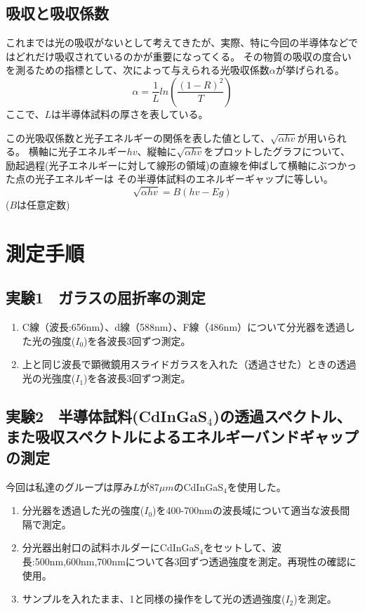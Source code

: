 \documentclass[11pt,a4j]{jsarticle}
\begin{document}
  \subsection{吸収と吸収係数}
   これまでは光の吸収がないとして考えてきたが、実際、特に今回の半導体などではどれだけ吸収されているのかが重要になってくる。
   その物質の吸収の度合いを測るための指標として、次によって与えられる光吸収係数$\alpha$が挙げられる。
   \begin{equation}
   \alpha = \frac{1}{L} ln(\frac{(1-R)^2}{T})
   \end{equation}
   ここで、$L$は半導体試料の厚さを表している。
   
   この光吸収係数と光子エネルギーの関係を表した値として、$\sqrt{\alpha h v}$が用いられる。
   横軸に光子エネルギー$hv$、縦軸に$\sqrt{\alpha h v}$をプロットしたグラフについて、
   励起過程(光子エネルギーに対して線形の領域)の直線を伸ばして横軸にぶつかった点の光子エネルギーは
   その半導体試料のエネルギーギャップに等しい。
   \begin{equation}
   \sqrt{\alpha hv} = B (hv - Eg)
   \end{equation}
   ($B$は任意定数)
   
  
  
 \section{測定手順}
  \subsection{実験1　ガラスの屈折率の測定}
	\begin{enumerate}
	\item C線（波長:656nm）、d線（588nm）、F線（486nm）について分光器を透過した光の強度($I_0$)を各波長3回ずつ測定。
	\item 上と同じ波長で顕微鏡用スライドガラスを入れた（透過させた）ときの透過光の光強度($I_1$)を各波長3回ずつ測定。
	\end{enumerate}
  
  \subsection{実験2　半導体試料(CdInGaS$_4$)の透過スペクトル、また吸収スペクトルによるエネルギーバンドギャップの測定}
  今回は私達のグループは厚み$L$が87$\mu m$のCdInGaS$_4$を使用した。
	\begin{enumerate}
	\item 分光器を透過した光の強度($I_0$)を400-700nmの波長域について適当な波長間隔で測定。
	\item 分光器出射口の試料ホルダーにCdInGaS$_4$をセットして、波長:500nm,600nm,700nmについて各3回ずつ透過強度を測定。再現性の確認に使用。
	\item サンプルを入れたまま、1と同様の操作をして光の透過強度($I_2$)を測定。
	\end{enumerate}
	
\end{document}
